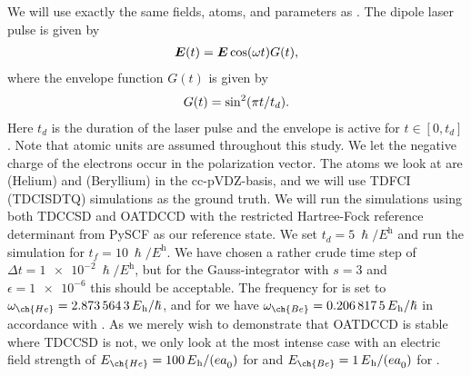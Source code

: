         We will use exactly the same fields, atoms, and parameters as
        \citeauthor{pedersen2018symplectic}.
        The dipole laser pulse is given by
        \begin{align}
            \vfg{E}(t)
            = \vfg{E} \cosine(\omega t) G(t),
        \end{align}
        where the envelope function $G(t)$ is given by
        \begin{align}
            G(t)
            = \sine^2(\pi t / t_d).
        \end{align}
        Here $t_d$ is the duration of the laser pulse and the envelope is active
        for $t \in [0, t_d]$.
        Note that atomic units are assumed throughout this study.
        We let the negative charge of the electrons occur in the polarization
        vector.
        The atoms we look at are  (Helium) and  (Beryllium) in the
        cc-pVDZ-basis, and we will use TDFCI (TDCISDTQ) simulations as the ground
        truth.
        We will run the simulations using both TDCCSD and OATDCCD with the
        restricted Hartree-Fock reference determinant from PySCF as our
        reference state.
        We set $t_d = \SI{5}{\hslash/\hartree}$ and run the simulation for $t_f
        = \SI{10}{\hslash/\hartree}$.
        We have chosen a rather crude time step of $\Delta t =
        \SI{1e-2}{\hslash/\hartree}$, but for the Gauss-integrator with $s = 3$
        and $\epsilon = \num{1e-6}$ this should be acceptable.
        The frequency for  is set to $\omega_{\ch{He}} =
        \SI{2.8735643}{\hartree/\hslash}$, and for  we have
        $\omega_{\ch{Be}} = \SI{0.2068175}{\hartree/\hslash}$ in accordance with
        \citeauthor{pedersen2018symplectic} \cite{pedersen2018symplectic}.
        As we merely wish to demonstrate that OATDCCD is stable where TDCCSD is
        not, we only look at the most intense case with an electric field
        strength of $E_{\ch{He}} = \SI{100}{\hartree/(\elementarycharge \bohr)}$
        for  and $E_{\ch{Be}} =
        \SI{1}{\hartree/(\elementarycharge\bohr)}$ for .

